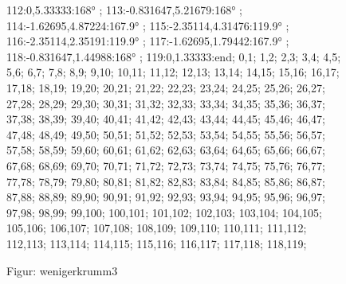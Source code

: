 \documentclass[a4paper,10pt,ngerman]{scrartcl}
\begin{document}
\begin{figure}[!h]
{            112:0,5.33333:168° ;
            113:-0.831647,5.21679:168° ;
            114:-1.62695,4.87224:167.9° ;
            115:-2.35114,4.31476:119.9° ;
            116:-2.35114,2.35191:119.9° ;
            117:-1.62695,1.79442:167.9° ;
            118:-0.831647,1.44988:168° ;
            119:0,1.33333:end;
        }{
            0,1;
            1,2;
            2,3;
            3,4;
            4,5;
            5,6;
            6,7;
            7,8;
            8,9;
            9,10;
            10,11;
            11,12;
            12,13;
            13,14;
            14,15;
            15,16;
            16,17;
            17,18;
            18,19;
            19,20;
            20,21;
            21,22;
            22,23;
            23,24;
            24,25;
            25,26;
            26,27;
            27,28;
            28,29;
            29,30;
            30,31;
            31,32;
            32,33;
            33,34;
            34,35;
            35,36;
            36,37;
            37,38;
            38,39;
            39,40;
            40,41;
            41,42;
            42,43;
            43,44;
            44,45;
            45,46;
            46,47;
            47,48;
            48,49;
            49,50;
            50,51;
            51,52;
            52,53;
            53,54;
            54,55;
            55,56;
            56,57;
            57,58;
            58,59;
            59,60;
            60,61;
            61,62;
            62,63;
            63,64;
            64,65;
            65,66;
            66,67;
            67,68;
            68,69;
            69,70;
            70,71;
            71,72;
            72,73;
            73,74;
            74,75;
            75,76;
            76,77;
            77,78;
            78,79;
            79,80;
            80,81;
            81,82;
            82,83;
            83,84;
            84,85;
            85,86;
            86,87;
            87,88;
            88,89;
            89,90;
            90,91;
            91,92;
            92,93;
            93,94;
            94,95;
            95,96;
            96,97;
            97,98;
            98,99;
            99,100;
            100,101;
            101,102;
            102,103;
            103,104;
            104,105;
            105,106;
            106,107;
            107,108;
            108,109;
            109,110;
            110,111;
            111,112;
            112,113;
            113,114;
            114,115;
            115,116;
            116,117;
            117,118;
            118,119;
        }
        \caption{Figur: wenigerkrumm3}
        \label{fig:wenigerkrumm3}
    \end{figure}
\end{document}
